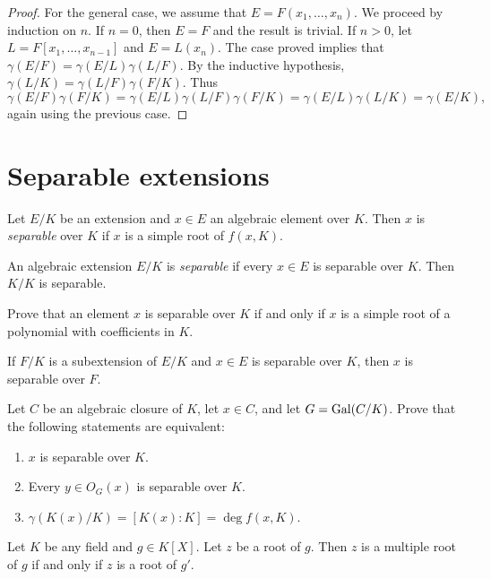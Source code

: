 \begin{proof}
    \medskip 
    For the general case, we assume that $E=F(x_1,\dots,x_n)$. We proceed
    by induction on $n$. If $n=0$, then $E=F$ and the result is trivial. 
    If $n>0$, let $L=F[x_1,\dots,x_{n-1}]$ and $E=L(x_n)$. The 
    case proved 
    implies that $\gamma(E/F)=\gamma(E/L)\gamma(L/F)$. By the inductive 
    hypothesis, $\gamma(L/K)=\gamma(L/F)\gamma(F/K)$. Thus 
    \[
    \gamma(E/F)\gamma(F/K)=\gamma(E/L)\gamma(L/F)\gamma(F/K)
    =\gamma(E/L)\gamma(L/K)=\gamma(E/K),
    \]
    again using the previous case. 
\end{proof}

\section{Separable extensions}

\begin{definition}
    Let $E/K$ be an extension and $x\in E$ an algebraic element over $K$. Then
    $x$ is \emph{separable} over $K$ if $x$ is a simple root
    of $f(x,K)$. 
\end{definition}

An algebraic extension $E/K$ is \emph{separable} 
if every $x\in E$ is separable over $K$. Then $K/K$ is separable. 

\begin{exercise}
    Prove that 
    an element $x$ is separable over $K$ if and only if $x$ is a simple root
    of a polynomial with coefficients in $K$. 
\end{exercise}

If $F/K$ is a subextension of $E/K$ and $x\in E$ is separable over $K$, then
$x$ is separable over $F$. 

\begin{exercise}
    Let $C$ be an algebraic closure of $K$, let $x\in C$, and let $G=\operatorname{Gal}(C/K)$.
    Prove that the following statements are equivalent:
    \begin{enumerate}
        \item $x$ is separable over $K$.
        \item Every $y\in O_G(x)$ is separable over $K$.
        \item $\gamma(K(x)/K)=[K(x):K]=\deg f(x,K)$. 
    \end{enumerate}
\end{exercise}

Let $K$ be any field and $g\in K[X]$. Let $z$ be a root of $g$. 
Then $z$ is a multiple root of $g$ if and only if $z$ is a root of $g'$. 


